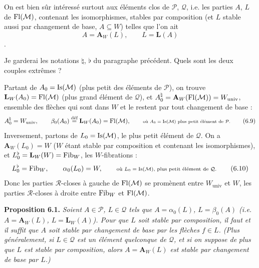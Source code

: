 On est bien sûr intéressé surtout aux éléments clos de $\mathcal{P}$, $\mathcal{Q}$, i.e. les parties $A$, $L$ de $\mathrm{Fl}(\mathcal{M})$, contenant les isomorphismes, stables par composition (et $L$ stable aussi par changement de base, $A \subseteq W$) telles que l'on ait
\[
A = \mathbf{A}_W(L), \qquad L = \mathbf{L}(A) \tag*{(6.8)}
\]
.


Je garderai les notations $\natural$, $\flat$ du paragraphe précédent. Quels sont les deux couples extrêmes ?

Partant de $A_0 = \mathrm{Is}(\mathcal{M})$ (plus petit des éléments de $\mathcal{P}$), on trouve $\mathbf{L}_W(A_0) = \mathrm{Fl}(\mathcal{M})$ (plus grand élément de $\mathcal{Q}$), et $A_0^{\natural} = \mathbf{A}_W(\mathrm{Fl}(\mathcal{M})) = W_{\mathrm{univ}}$, ensemble des flèches qui sont dans $W$ et le restent par tout changement de base :
\[
A_0^{\natural} = W_{\mathrm{univ}}, \qquad \beta_0(A_0) \overset{\text{déf}}{=} \mathbf{L}_W(A_0) = \mathrm{Fl}(\mathcal{M}), \qquad \text{\scriptsize où $A_0 = \mathrm{Is}(\mathcal{M})$ plus petit élément de $\mathcal{P}$.} \tag*{(6.9)}
\]
Inversement, partons de $L_0 = \mathrm{Is}(\mathcal{M})$, le plus petit élément de $\mathcal{Q}$. On a $\mathbf{A}_W(L_0) = W$ ($W$ étant stable par composition et contenant les isomorphismes), et $L_0^{\flat} = \mathbf{L}_W(W) = \mathrm{Fib}_W$, les $W$-fibrations :
\[
L_0^{\flat} = \mathrm{Fib}_W, \qquad \alpha_0(L_0) = W, \qquad \text{\scriptsize où $L_0 = \mathrm{Is}(\mathcal{M})$, plus petit élément de $\mathcal{Q}$.} \tag*{(6.10)}
\]
Donc les parties $\mathcal{R}$-closes à gauche de $\mathrm{Fl}(\mathcal{M})$ se promènent entre $W_{\mathrm{univ}}$ et $W$, les parties $\mathcal{R}$-closes à droite entre $\mathrm{Fib}_W$ et $\mathrm{Fl}(\mathcal{M})$.

\textbf{Proposition 6.1.} \textit{Soient $A \in \mathcal{P}$, $L \in \mathcal{Q}$ tels que $A = \alpha_0(L)$, $L = \beta_0(A)$ (i.e. $A = \mathbf{A}_W(L)$, $L = \mathbf{L}_W(A)$). Pour que $L$ soit stable par composition, il faut et il suffit que $A$ soit stable par changement de base par les flèches $f \in L$. (Plus généralement, si $L \in \mathcal{Q}$ est un élément quelconque de $\mathcal{Q}$, et si on suppose de}  \textit{plus que $L$ est stable par composition, alors $A = \mathbf{A}_W(L)$ est stable par changement de base par $L$.)}

